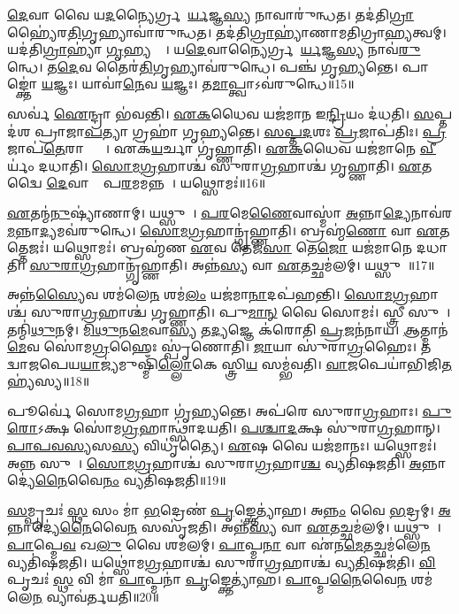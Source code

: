 \ul{𑌦𑍇}𑌵𑌾 𑌵𑍈 𑌯\ul{𑌦}𑌨𑍍𑌯𑍈𑌰𑍍𑌗𑍍𑌰𑌹𑍈᳚\ul{𑌰𑍍𑌯}𑌜𑍍𑌞\ul{𑌸𑍍𑌯} 𑌨𑌾𑌵𑌾𑌰𑍁॑𑌨𑍍𑌧𑌤।
𑌤𑌦॑𑌤𑌿\ul{𑌗𑍍𑌰𑌾}𑌹𑍍𑌯𑍈॑𑌰\ul{𑌤𑌿}\-𑌗𑍃𑌹𑍍𑌯𑌾\-𑌵𑌾॑𑌰𑍁𑌨𑍍𑌧𑌤।
𑌤𑌦॑𑌤𑌿\ul{𑌗𑍍𑌰𑌾}𑌹𑍍𑌯𑌾॑𑌣𑌾𑌮𑌤𑌿𑌗𑍍𑌰𑌾\ul{𑌹𑍍𑌯}𑌤𑍍𑌵𑌮𑍍।
𑌯𑌦॑𑌤𑌿\ul{𑌗𑍍𑌰𑌾}𑌹𑍍𑌯𑌾॑ \ul{𑌗𑍃}𑌹𑍍𑌯𑌨𑍍𑌤𑍇᳚।
𑌯\ul{𑌦𑍇}𑌵𑌾𑌨𑍍𑌯𑍈𑌰𑍍𑌗𑍍𑌰𑌹𑍈᳚\ul{𑌰𑍍𑌯}𑌜𑍍𑌞\ul{𑌸𑍍𑌯} 𑌨𑌾𑌵॑\ul{𑌰𑍁}𑌨𑍍𑌧𑍇।
𑌤\ul{𑌦𑍇}𑌵 𑌤𑍈𑌰॑\ul{𑌤𑌿}𑌗𑍃𑌹𑍍𑌯𑌾\-𑌵॑𑌰𑍁𑌨𑍍𑌧𑍇।
𑌪𑌞𑍍𑌚॑ 𑌗𑍃𑌹𑍍𑌯𑌨𑍍𑌤𑍇।
𑌪𑌾𑌙𑍍𑌕𑍍𑌤𑍋॑ \ul{𑌯}𑌜𑍍𑌞𑌃।
𑌯𑌾𑌵𑌾॑\ul{𑌨𑍇}𑌵 \ul{𑌯}𑌜𑍍𑌞𑌃।
𑌤\ul{𑌮𑌾}𑌪𑍍𑌤𑍍𑌵𑌾\-𑌽𑌵॑𑌰𑍁𑌨𑍍𑌧𑍇॥15॥

𑌸𑌰𑍍𑌵॑ \ul{𑌐}𑌨𑍍𑌦𑍍𑌰𑌾 𑌭॑𑌵𑌨𑍍𑌤𑌿।
\ul{𑌏}\ul{𑌕}𑌧𑍈𑌵 𑌯𑌜॑𑌮𑌾𑌨 𑌇\ul{𑌨𑍍𑌦𑍍𑌰𑌿}𑌯𑌂 𑌦॑𑌧𑌤𑌿।
\ul{𑌸}𑌪𑍍𑌤𑌦॑𑌶 𑌪𑍍𑌰𑌾𑌜𑌾\ul{𑌪}𑌤𑍍𑌯𑌾 𑌗𑍍𑌰𑌹𑌾॑ 𑌗𑍃𑌹𑍍𑌯𑌨𑍍𑌤𑍇।
\ul{𑌸}\ul{𑌪𑍍𑌤}\ul{𑌦}𑌶𑌃 \ul{𑌪𑍍𑌰}𑌜𑌾𑌪॑𑌤𑌿𑌃।
\ul{𑌪𑍍𑌰}𑌜𑌾𑌪॑\ul{𑌤𑍇}𑌰𑌾𑌪𑍍𑌤𑍍𑌯𑍈᳚।
𑌏𑌕॑\ul{𑌯}𑌰𑍍𑌚𑌾 𑌗𑍃॑𑌹𑍍𑌣𑌾𑌤𑌿।
\ul{𑌏}\ul{𑌕}𑌧𑍈𑌵 𑌯𑌜॑𑌮𑌾𑌨𑍇 \ul{𑌵𑍀}𑌰𑍍𑌯𑌂॑ 𑌦𑌧𑌾𑌤𑌿।
\ul{𑌸𑍋}\ul{𑌮}\ul{𑌗𑍍𑌰}𑌹𑌾𑌶𑍍𑌚॑ 𑌸𑍁𑌰𑌾\ul{𑌗𑍍𑌰}𑌹𑌾𑌶𑍍𑌚॑ 𑌗𑍃𑌹𑍍𑌣𑌾𑌤𑌿।
\ul{𑌏}𑌤𑌦𑍍𑌵𑍈 \ul{𑌦𑍇}𑌵𑌾𑌨𑌾𑌂᳚ 𑌪\ul{𑌰}𑌮𑌮𑌨𑍍𑌨𑌮𑍍᳚।
𑌯𑌥𑍍𑌸𑍋𑌮𑌃॑॥16॥

\ul{𑌏}𑌤𑌨𑍍𑌮॑\ul{𑌨𑍁}𑌷𑍍𑌯𑌾॑𑌣𑌾𑌮𑍍।
𑌯𑌥𑍍𑌸𑍁𑌰𑌾᳚।
\ul{𑌪}\ul{𑌰}𑌮𑍇\ul{𑌣𑍈}𑌵𑌾𑌸𑍍𑌮𑌾॑ \ul{𑌅}𑌨𑍍𑌨𑌾\ul{𑌦𑍍𑌯𑍇}𑌨𑌾𑌵॑𑌰\-\ul{𑌮}𑌨𑍍𑌨𑌾\ul{𑌦𑍍𑌯}𑌮𑌵॑𑌰𑍁𑌨𑍍𑌧𑍇।
\ul{𑌸𑍋}\ul{𑌮}\ul{𑌗𑍍𑌰}𑌹𑌾𑌨𑍍𑌗𑍃॑𑌹𑍍𑌣𑌾𑌤𑌿।
𑌬𑍍𑌰𑌹𑍍𑌮॑\ul{𑌣𑍋} 𑌵𑌾 \ul{𑌏}𑌤𑌤𑍍𑌤𑍇𑌜𑌃॑।
𑌯𑌥𑍍𑌸𑍋𑌮𑌃॑।
𑌬𑍍𑌰𑌹𑍍𑌮॑𑌣 \ul{𑌏}𑌵 𑌤𑍇𑌜॑\ul{𑌸𑌾} 𑌤𑍇\ul{𑌜𑍋} 𑌯𑌜॑𑌮𑌾𑌨𑍇 𑌦𑌧𑌾𑌤𑌿।
\ul{𑌸𑍁}\ul{𑌰𑌾}\ul{𑌗𑍍𑌰}𑌹𑌾𑌨𑍍𑌗𑍃॑𑌹𑍍𑌣𑌾𑌤𑌿।
𑌅𑌨𑍍𑌨॑\ul{𑌸𑍍𑌯} 𑌵𑌾 \ul{𑌏}𑌤𑌚𑍍𑌛𑌮॑𑌲𑌮𑍍।
𑌯𑌥𑍍𑌸𑍁𑌰𑌾᳚॥17॥

𑌅𑌨𑍍𑌨॑\ul{𑌸𑍍𑌯𑍈}𑌵 𑌶𑌮॑𑌲𑍇\ul{𑌨} 𑌶𑌮॑\ul{𑌲𑌂} 𑌯𑌜॑𑌮𑌾\ul{𑌨𑌾}𑌦𑌪॑𑌹𑌨𑍍𑌤𑌿।
\ul{𑌸𑍋}\ul{𑌮}\ul{𑌗𑍍𑌰}𑌹𑌾𑌶𑍍𑌚॑ 𑌸𑍁𑌰𑌾\ul{𑌗𑍍𑌰}𑌹𑌾𑌶𑍍𑌚॑ 𑌗𑍃𑌹𑍍𑌣𑌾𑌤𑌿।
𑌪𑍁\ul{𑌮𑌾}\ul{𑌨𑍍} 𑌵𑍈 𑌸𑍋𑌮𑌃॑।
𑌸𑍍𑌤𑍍𑌰𑍀 𑌸𑍁𑌰𑌾᳚।
𑌤𑌨𑍍𑌮𑌿॑\ul{𑌥𑍁}𑌨𑌮𑍍।
\ul{𑌮𑌿}\ul{𑌥𑍁}𑌨\ul{𑌮𑍇}𑌵𑌾\ul{𑌸𑍍𑌯} 𑌤\ul{𑌦𑍍𑌯}𑌜𑍍𑌞𑍇 𑌕॑𑌰𑍋𑌤𑌿 \ul{𑌪𑍍𑌰}𑌜𑌨॑𑌨𑌾𑌯।
\ul{𑌆}𑌤𑍍𑌮𑌾𑌨॑\ul{𑌮𑍇}𑌵 𑌸𑍋॑𑌮\ul{𑌗𑍍𑌰}𑌹𑍈𑌃 𑌸𑍍𑌪𑍃॑𑌣𑍋𑌤𑌿।
\ul{𑌜𑌾}𑌯𑌾 𑌸𑍁॑𑌰𑌾\ul{𑌗𑍍𑌰}𑌹𑍈𑌃।
𑌤𑌸𑍍𑌮𑌾᳚𑌦𑍍𑌵𑌾𑌜𑌪𑍇𑌯\ul{𑌯𑌾}𑌜𑍍𑌯॑𑌮𑍁𑌷𑍍𑌮𑌿𑌁॑\ul{𑌲𑍍𑌲𑍋}𑌕𑍇 𑌸𑍍𑌤𑍍𑌰𑌿\ul{𑌯}\ul{} 𑌸𑌮𑍍𑌭॑𑌵𑌤𑌿।
\ul{𑌵𑌾}\ul{𑌜}𑌪𑍇𑌯𑌾॑𑌭𑌿𑌜𑌿\ul{𑌤}\ul{} 𑌹𑍍𑌯॑𑌸𑍍𑌯॥18॥

𑌪𑍂𑌰𑍍𑌵𑍇॑ 𑌸𑍋𑌮\ul{𑌗𑍍𑌰}𑌹𑌾 𑌗𑍃॑𑌹𑍍𑌯𑌨𑍍𑌤𑍇।
𑌅𑌪॑𑌰𑍇 𑌸𑍁𑌰𑌾\ul{𑌗𑍍𑌰}𑌹𑌾𑌃।
\ul{𑌪𑍁}\ul{𑌰𑍋}\-𑌽𑌕𑍍𑌷 𑌸𑍋॑𑌮\ul{𑌗𑍍𑌰}𑌹𑌾𑌨𑍍𑌥𑍍𑌸𑌾॑𑌦𑌯𑌤𑌿।
\ul{𑌪}\ul{𑌶𑍍𑌚𑌾}\ul{𑌦}𑌕𑍍𑌷 𑌸𑍁॑𑌰𑌾\ul{𑌗𑍍𑌰}𑌹𑌾𑌨𑍍।
\ul{𑌪𑌾}\ul{𑌪}\ul{𑌵}\ul{𑌸𑍍𑌯}𑌸\ul{𑌸𑍍𑌯} 𑌵𑌿𑌧𑍃॑𑌤𑍍𑌯𑍈।
\ul{𑌏}𑌷 𑌵𑍈 𑌯𑌜॑𑌮𑌾𑌨𑌃।
𑌯𑌥𑍍𑌸𑍋𑌮𑌃॑।
𑌅\ul{𑌨𑍍𑌨}\ul{} 𑌸𑍁𑌰𑌾᳚।
\ul{𑌸𑍋}\ul{𑌮}\ul{𑌗𑍍𑌰}𑌹𑌾𑌶𑍍𑌚॑ 𑌸𑍁𑌰𑌾\ul{𑌗𑍍𑌰}𑌹𑌾\ul{𑌶𑍍𑌚} 𑌵𑍍𑌯𑌤𑌿॑𑌷𑌜𑌤𑌿।
\ul{𑌅}𑌨𑍍𑌨𑌾𑌦𑍍𑌯𑍇॑\ul{𑌨𑍈}𑌵𑍈\ul{𑌨𑌂} 𑌵𑍍𑌯𑌤𑌿॑𑌷𑌜𑌤𑌿॥19॥

\ul{𑌸}𑌮𑍍𑌪𑍃𑌚𑌃॑ \ul{𑌸𑍍𑌥} 𑌸𑌂 𑌮𑌾॑ \ul{𑌭}𑌦𑍍𑌰𑍇𑌣॑ \ul{𑌪𑍃}𑌙𑍍𑌕𑍍𑌤𑍇𑌤𑍍𑌯𑌾॑𑌹।
𑌅\ul{𑌨𑍍𑌨𑌂} 𑌵𑍈 \ul{𑌭}𑌦𑍍𑌰𑌮𑍍।
\ul{𑌅}𑌨𑍍𑌨𑌾𑌦𑍍𑌯𑍇॑\ul{𑌨𑍈}𑌵𑍈\ul{𑌨}\ul{} 𑌸𑌸𑍃॑𑌜𑌤𑌿।
𑌅𑌨𑍍𑌨॑\ul{𑌸𑍍𑌯} 𑌵𑌾 \ul{𑌏}𑌤𑌚𑍍𑌛𑌮॑𑌲𑌮𑍍।
𑌯𑌥𑍍𑌸𑍁𑌰𑌾᳚।
\ul{𑌪𑌾}𑌪𑍍𑌮𑍇\ul{𑌵} 𑌖\ul{𑌲𑍁} 𑌵𑍈 𑌶𑌮॑𑌲𑌮𑍍।
\ul{𑌪𑌾}𑌪𑍍𑌮\ul{𑌨𑌾} 𑌵𑌾 𑌏॑𑌨\ul{𑌮𑍇}𑌤𑌚𑍍𑌛𑌮॑𑌲𑍇\ul{𑌨} 𑌵𑍍𑌯𑌤𑌿॑𑌷𑌜𑌤𑌿।
𑌯𑌥𑍍𑌸𑍋॑𑌮\ul{𑌗𑍍𑌰}𑌹𑌾𑌶𑍍𑌚॑ 𑌸𑍁𑌰𑌾\ul{𑌗𑍍𑌰}𑌹𑌾𑌶𑍍𑌚॑ 𑌵𑍍𑌯\ul{𑌤𑌿}𑌷𑌜॑𑌤𑌿।
\ul{𑌵𑌿}𑌪𑍃𑌚𑌃॑ \ul{𑌸𑍍𑌥} 𑌵𑌿 𑌮𑌾॑ \ul{𑌪𑌾}𑌪𑍍𑌮𑌨𑌾॑ \ul{𑌪𑍃}𑌙𑍍𑌕𑍍𑌤𑍇𑌤𑍍𑌯𑌾॑𑌹।
\ul{𑌪𑌾}𑌪𑍍𑌮\ul{𑌨𑍈}𑌵𑍈\ul{𑌨}\ul{} 𑌶𑌮॑𑌲𑍇\ul{𑌨} 𑌵𑍍𑌯𑌾𑌵॑𑌰𑍍𑌤𑌯𑌤𑌿॥20॥

